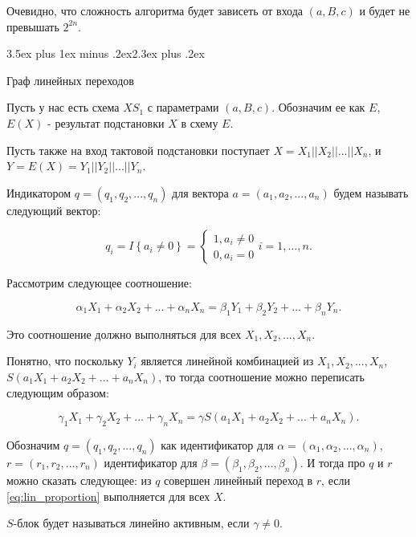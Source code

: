 \documentclass[a4paper,12pt]{report}
\makeatletter
\theoremstyle{plain} %
\theoremstyle{definition}
\theoremstyle{remark}
\renewcommand{\section}{\@startsection{section}{1}{18pt}%
{3.5ex plus 1ex minus .2ex}{2.3ex plus .2ex}%
{\normalfont\Large\bfseries\raggedright}}%
\makeatother
\begin{document}
\begin{large}
Очевидно, что сложность алгоритма будет зависеть от входа $(a,B,c)$ и будет не превышать $2^{2n}$.

\section{Граф линейных переходов}

Пусть у нас есть схема $XS_1$ с параметрами $(a, B, c)$. Обозначим ее как $E$,  $E(X)$ - результат подстановки $X$ в схему $E$. 

Пусть также на вход тактовой подстановки поступает $X = X_1||X_2||...||X_n$, и $Y=E(X) = Y_1||Y_2||...||Y_n$.

Индикатором $q = (q_1, q_2, ..., q_n)$ для вектора $a=(a_1, a_2, ..., a_n)$ будем называть следующий вектор:

\begin{equation}
q_i=I\left\{a_i\ne 0\right\}=\left\{ \begin{array}{c}
1,a_i \neq 0 \\
0,a_i = 0\end{array}
\right.i=1,\dots , n.
\end{equation}

Рассмотрим следующее соотношение:

\begin{equation}
\label{eq:lin_proportion}
\alpha_1X_1 + \alpha_2X_2 + ... + \alpha_nX_n = \beta_1Y_1 + \beta_2Y_2 + ... + \beta_nY_n.
\end{equation}

Это соотношение должно выполняться для всех $X_1, X_2, ..., X_n$.

Понятно, что поскольку $Y_i$ является линейной комбинацией из $X_1, X_2, ..., X_n$, $S(a_1X_1 + a_2X_2 + ... + a_nX_n)$, то тогда соотношение можно переписать следующим образом:

\begin{equation}\label{eq:in_gamma}
\gamma_1X_1 + \gamma_2X_2 + ... + \gamma_nX_n = \gamma S(a_1X_1 + a_2X_2 + ... + a_nX_n).\end{equation}

Обозначим $q=(q_1, q_2, ..., q_n)$ как идентификатор для $\alpha=(\alpha_1, \alpha_2, ..., \alpha_n)$, $r=(r_1, r_2, ..., r_n)$ идентификатор для $\beta = (\beta_1, \beta_2, ..., \beta_n)$. И тогда про $q$ и $r$ можно сказать следующее: из $q$ совершен линейный переход в $r$, если \ref{eq:lin_proportion} выполняется для всех $X$. 

$S$-блок будет называться линейно активным, если $\gamma \neq 0$.


\end{large}
\end{document}
